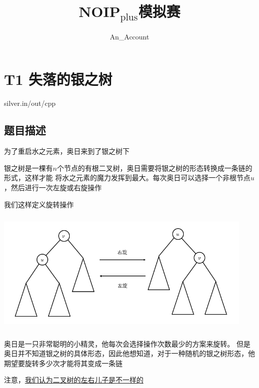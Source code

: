 \documentclass[12pt]{article}
\title{NOIP$_{\text{plus}}$模拟赛}
\author{An\_Account}
\date{}
\begin{document}
    
    \section{T1 失落的银之树}
    silver.in/out/cpp
    \subsection{题目描述}
    为了重启水之元素，奥日来到了银之树下\par
    银之树是一棵有$n$个节点的有根二叉树，奥日需要将银之树的形态转换成一条链的形式，这样才能
    将水之元素的魔力发挥到最大。每次奥日可以选择一个非根节点$u$，然后进行一次左旋或右旋操作\par
    我们这样定义旋转操作\par
    \centerline{\includegraphics[height=6.0cm, width=12.5cm]{splay.png}}\par
    奥日是一只非常聪明的小精灵，他每次会选择操作次数最少的方案来旋转。
    但是奥日并不知道银之树的具体形态，因此他想知道，对于一种随机的银之树形态，他期望要旋转多少次才能将其变成一条链\par
    注意，\underline{我们认为二叉树的左右儿子是不一样的}
\end{document}
